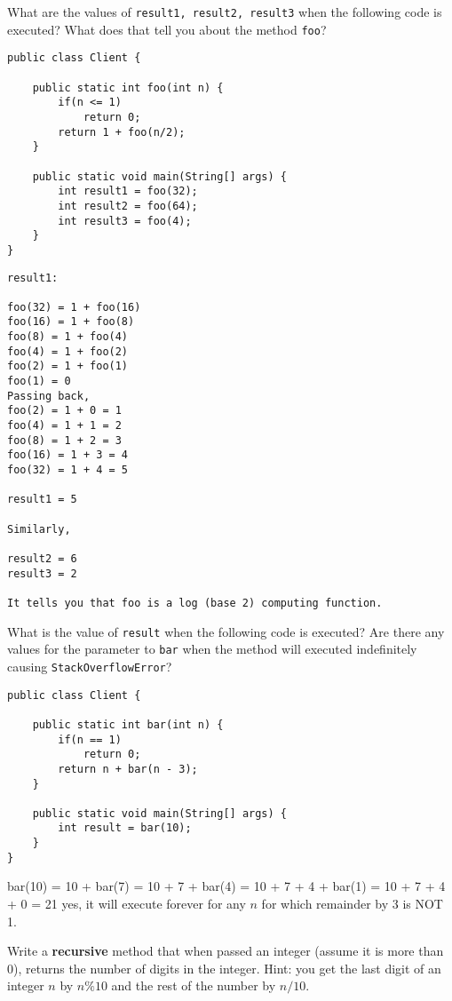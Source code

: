 \documentclass[11pt]{exam}
\begin{document}
\begin{questions}
\question What are the values of \texttt{result1, result2, result3} when the following code is executed? What does that tell you about the method \texttt{foo}?

\begin{lstlisting}
public class Client {

	public static int foo(int n) {
		if(n <= 1)
			return 0;
		return 1 + foo(n/2);
	}
	
	public static void main(String[] args) {
		int result1 = foo(32);
		int result2 = foo(64);
		int result3 = foo(4);
	}
}
\end{lstlisting}

\begin{solution}
\begin{verbatim}
result1:

foo(32) = 1 + foo(16)
foo(16) = 1 + foo(8)
foo(8) = 1 + foo(4)
foo(4) = 1 + foo(2)
foo(2) = 1 + foo(1)
foo(1) = 0
Passing back,
foo(2) = 1 + 0 = 1
foo(4) = 1 + 1 = 2
foo(8) = 1 + 2 = 3
foo(16) = 1 + 3 = 4
foo(32) = 1 + 4 = 5

result1 = 5

Similarly,

result2 = 6
result3 = 2

It tells you that foo is a log (base 2) computing function.
\end{verbatim}
\end{solution}

\question What is the value of \texttt{result} when the following code is executed? Are there any values for the parameter to \texttt{bar} when the method will executed indefinitely causing \texttt{StackOverflowError}?

\begin{lstlisting}
public class Client {

	public static int bar(int n) {
		if(n == 1)
			return 0;
		return n + bar(n - 3);
	}
	
	public static void main(String[] args) {
		int result = bar(10);
	}
}
\end{lstlisting}

\begin{solution}
bar(10) = 10 + bar(7) = 10 + 7 + bar(4) = 10 + 7 + 4 + bar(1) = 10 + 7 + 4 + 0 = 21
\vskip 0.5cm
yes, it will execute forever for any $n$ for which remainder by 3 is NOT 1.
\end{solution}


\question Write a \textbf{recursive} method that when passed an integer (assume it is more than 0), returns the number of digits in the integer. Hint: you get the last digit of an integer $n$ by $n\%10$ and the rest of the number by $n/10$.


\end{questions}
\end{document}
